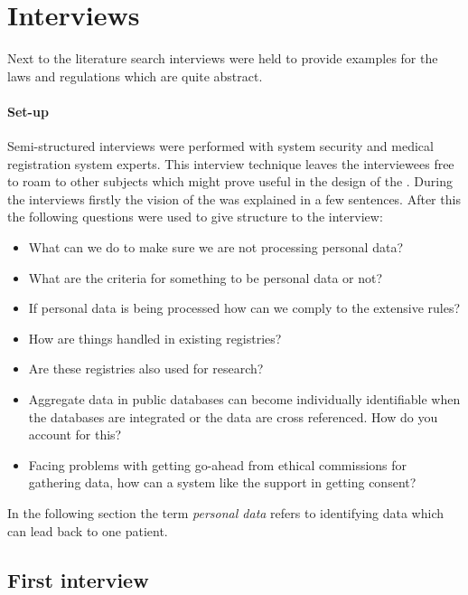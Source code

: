 \section{Interviews}
\label{security-interviews}

Next to the literature search interviews were held to provide examples for the laws and regulations which are quite abstract.

\paragraph{Set-up} 
\label{security-set-up}

Semi-structured interviews were performed with system security and medical registration system experts.
This interview technique leaves the interviewees free to roam to other subjects which might prove useful in the design of the \ivfsystem{}.
During the interviews firstly the vision of the \ivfsystem{} was explained in a few sentences.
After this the following questions were used to give structure to the interview:

\begin{itemize}
	\item What can we do to make sure we are not processing personal data?
	\item What are the criteria for something to be personal data or not?
	\item If personal data is being processed how can we comply to the extensive rules?
	\item How are things handled in existing registries?
	\item Are these registries also used for research?
	\item Aggregate data in public databases can become individually identifiable when the databases are integrated or the data are cross referenced. 
	How do you account for this?
	\item Facing problems with getting go-ahead from ethical commissions for gathering data, how can a system like the \ivfsystem{} support in getting consent?
\end{itemize}

In the following section the term \emph{personal data} refers to identifying data which can lead back to one patient.

\subsection{First interview}
\label{security-first-interview}

